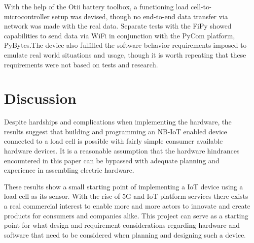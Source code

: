 \iffalse
\begin{itemize}
	\item Don’t make the reader do all the work
	\item Have a hypothesis, test them, state result clearly
	\item Two lists are not a comparison
	\item Be the first to criticize your own work
\end{itemize}
\fi


With the help of the Otii battery toolbox, a functioning load cell-to-microcontroller setup was devised, though no end-to-end data transfer via network was made with the real data. Separate tests with the FiPy showed capabilities to send data via WiFi in conjunction with the PyCom platform, PyBytes.The device also fulfilled the software behavior requirements imposed to emulate real world situations and usage, though it is worth repeating that these requirements were not based on tests and research.

\section{Discussion}
Despite hardships and complications when implementing the hardware, the results suggest that building and programming an NB-IoT enabled device connected to a load cell is possible with fairly simple consumer available hardware devices. It is a reasonable assumption that the hardware hindrances encountered in this paper can be bypassed with adequate planning and experience in assembling electric hardware.

These results show a small starting point of implementing a IoT device using a load cell as its sensor. With the rise of 5G and IoT platform services there exists a real commercial interest to enable more and more actors to innovate and create products for consumers and companies alike. This project can serve as a starting point for what design and requirement considerations regarding hardware and software that need to be considered when planning and designing such a device.

